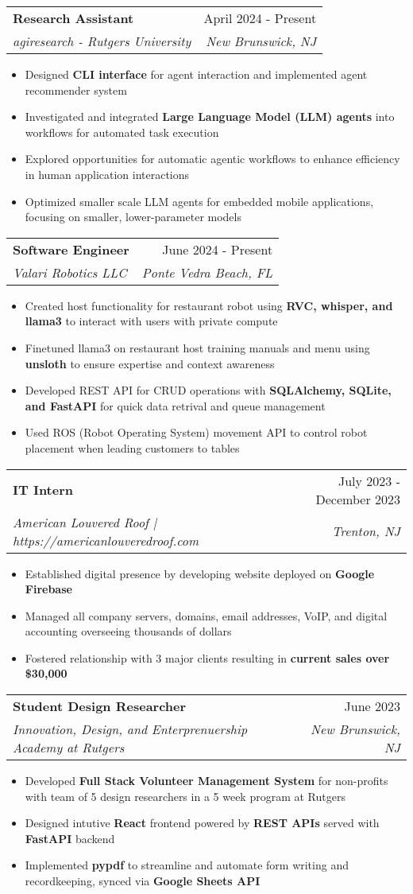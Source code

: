 \documentclass[letterpaper,10pt]{article}
\makeatletter
\newcommand{\resumeItem}[1]{
  \item\small{
    {#1 \vspace{-2pt}}
  }
}
\newcommand{\resumeSubheading}[4]{
  \vspace{-2pt}\item
    \begin{tabular*}{0.97\textwidth}[t]{l@{\extracolsep{\fill}}r}
      \textbf{#1} & #2 \\
      \textit{\small#3} & \textit{\small #4} \\
    \end{tabular*}\vspace{-7pt}
}
\newcommand{\resumeSubSubheading}[2]{
    \item
    \begin{tabular*}{0.97\textwidth}{l@{\extracolsep{\fill}}r}
      \textit{\small#1} & \textit{\small #2} \\
    \end{tabular*}\vspace{-7pt}
}
\newcommand{\resumeSubHeadingListEnd}{\end{itemize}}
\newcommand{\resumeItemListStart}{\begin{itemize}}
\newcommand{\resumeItemListEnd}{\end{itemize}\vspace{-5pt}}
\makeatother
\begin{document}
      
    \resumeSubheading
      {Research Assistant}{April 2024 - Present}
      {agiresearch - Rutgers University}{New Brunswick, NJ}
      \resumeItemListStart
	\resumeItem{Designed \textbf{CLI interface} for agent interaction and implemented agent recommender system}
	\resumeItem{Investigated and integrated \textbf{Large Language Model (LLM) agents} into workflows for automated task execution}
	\resumeItem{Explored opportunities for automatic agentic workflows to enhance efficiency in human application interactions}
	\resumeItem{Optimized smaller scale LLM agents for embedded mobile applications, focusing on smaller, lower-parameter models}
    \resumeItemListEnd

    \resumeSubheading
      {Software Engineer}{June 2024 - Present}
      {Valari Robotics LLC}{Ponte Vedra Beach, FL}
      \resumeItemListStart
	\resumeItem{Created host functionality for restaurant robot using \textbf{RVC, whisper, and llama3} to interact with users with private compute}
        \resumeItem{Finetuned llama3 on restaurant host training manuals and menu using \textbf{unsloth} to ensure expertise and context awareness}
	\resumeItem{Developed REST API for CRUD operations with \textbf{SQLAlchemy, SQLite, and FastAPI} for quick data retrival and queue management}
        \resumeItem{Used ROS (Robot Operating System) movement API to control robot placement when leading customers to tables}
    \resumeItemListEnd

    \resumeSubheading
      {IT Intern}{July 2023 - December 2023}
      {American Louvered Roof  | https://americanlouveredroof.com}{Trenton, NJ}
      \resumeItemListStart
      \resumeItem{Established digital presence by developing website deployed on \textbf{Google Firebase}}
        \resumeItem{Managed all company servers, domains, email addresses, VoIP, and digital accounting overseeing thousands of dollars}
        \resumeItem{Fostered relationship with 3 major clients resulting in \textbf{current sales over \$30,000}}
    \resumeItemListEnd

    \resumeSubheading
      {Student Design Researcher}{June 2023}
      {Innovation, Design, and Enterprenuership Academy at Rutgers}{New Brunswick, NJ}
      \resumeItemListStart
      \resumeItem{Developed \textbf{Full Stack Volunteer Management System} for non-profits with team of 5 design researchers in a 5 week program at Rutgers}
      \resumeItem{Designed intutive \textbf{React} frontend powered by \textbf{REST APIs} served with \textbf{FastAPI} backend}
      \resumeItem{Implemented \textbf{pypdf} to streamline and automate form writing and recordkeeping, synced via \textbf{Google Sheets API}}
      \resumeItemListEnd
\end{document}
